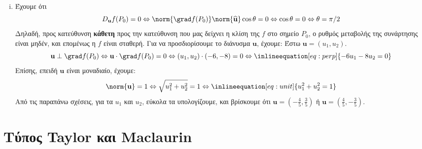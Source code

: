 \documentclass[a4paper,table]{report}
\begin{document}
\begin{solution}
\begin{enumerate}[i)]
    \item Έχουμε ότι 
      \[ 
        D_{\mathbf{u}}f(P_{0}) = 0 \Leftrightarrow \norm{\grad f (P_{0})}
        \norm{\mathbf{\widehat{u}}} \cos{\theta} = 0 \Leftrightarrow 
        \cos{\theta} = 0 \Leftrightarrow \theta = \pi/2 
      \]
      Δηλαδή, προς κατεύθυνση \textbf{κάθετη} προς την κατεύθυνση που μας δείχνει η 
      κλίση της $ f $ στο σημείο $ P_{0} $, ο ρυθμός μεταβολής της συνάρτησης είναι 
      μηδέν, και επομένως η $f$ είναι σταθερή. Για να προσδιορίσουμε το διάνυσμα $
      \mathbf{u} $, έχουμε: Έστω $ \mathbf{u} = (u_{1}, u_{2}) $. 
      \[
        \mathbf{u} \perp \grad f(P_{0}) \Leftrightarrow \mathbf{u} \cdot 
        \grad f (P_{0}) = 0 \Leftrightarrow (u_1,u_{2}) \cdot (-6,-8) =
        0 \Leftrightarrow \inlineequation[eq:perp]{-6u_{1}-8u_{2}=0}
      \]
      Επίσης, επειδή $ \mathbf{u} $ είναι μοναδιαίο, έχουμε: 
      \[
        \norm{\mathbf{u}} =1 \Leftrightarrow \sqrt{u_{1}^{2}+u_{2}^{2}} = 1
        \Leftrightarrow \inlineequation[eq:unit]{u_{1}^{2}+u_{2}^{2}=1}
      \] 
      Από τις παραπάνω σχέσεις, για τα $ u_{1} $ και $ u_{2} $, εύκολα τα υπολογίζουμε,
      και βρίσκουμε ότι $ \mathbf{u} = \left(- \frac{4}{5}
      , \frac{3}{5}\right) $ ή $ \mathbf{u} = 
      \left( \frac{4}{5} , - \frac{3}{5}\right) $. 
  \end{enumerate}
\end{solution}


\section{Τύπος Taylor και Maclaurin}
\end{document}

